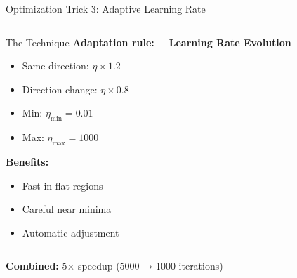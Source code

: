 \documentclass[aspectratio=169]{beamer}
\begin{document}
\begin{frame}{Optimization Trick 3: Adaptive Learning Rate}
\begin{columns}
\begin{block}{The Technique}
\textbf{Adaptation rule:}
\small
\begin{itemize}
\item Same direction: $\eta \times 1.2$
\item Direction change: $\eta \times 0.8$
\item Min: $\eta_{\min} = 0.01$
\item Max: $\eta_{\max} = 1000$
\end{itemize}
\normalsize

\textbf{Benefits:}
\begin{itemize}
\item Fast in flat regions
\item Careful near minima
\item Automatic adjustment
\end{itemize}
\end{block}

\begin{center}
\textbf{Learning Rate Evolution}\\[3mm]
\end{center}
\end{columns}

\vspace{3mm}
\begin{center}
\colorbox{green!20}{\parbox{0.85\textwidth}{\centering
\textbf{Combined:} 5× speedup (5000 → 1000 iterations)}}
\end{center}
\end{frame}
\end{document}
